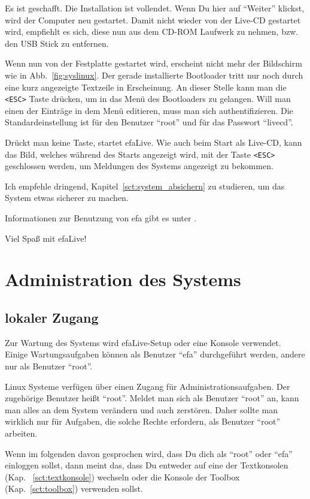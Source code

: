 \documentclass[a4paper,12pt,twoside]{article}
\begin{document}
Es ist geschafft. Die Installation ist vollendet. Wenn Du hier auf
"`Weiter"' klickst, wird der Computer neu
gestartet. Damit nicht wieder von der Live-CD gestartet wird, empfiehlt
es sich, diese nun aus dem CD-ROM Laufwerk zu nehmen, bzw. den USB
Stick zu entfernen.

Wenn nun von der Festplatte gestartet wird, erscheint nicht mehr der
Bildschirm wie in Abb.~\ref{fig:syslinux}. Der gerade installierte
Bootloader tritt nur noch durch eine kurz angezeigte Textzeile in
Erscheinung. An dieser Stelle kann man die \texttt{{\textless}ESC{\textgreater}}
Taste drücken, um in das Menü des Bootloaders zu gelangen. Will man
einen der Einträge in dem Menü editieren, muss man sich
authentifizieren. Die Standardeinstellung ist für den Benutzer
"`root"' und für das Passwort "`livecd"'. 

Drückt man keine Taste, startet efaLive. Wie auch beim Start als
Live-CD, kann das Bild, welches während des Starts angezeigt wird, mit
der Taste \texttt{{\textless}ESC{\textgreater}} geschlossen werden, um Meldungen
des Systems angezeigt zu bekommen.

Ich empfehle dringend, Kapitel~\ref{sct:system_absichern} zu studieren, um das System etwas
sicherer zu machen.

\bigskip
Informationen zur Benutzung von efa gibt es unter \cite{EFA2}.

\bigskip
Viel Spaß mit efaLive!


\section{Administration des Systems}
\label{sct:administration}
\subsection{lokaler Zugang}
\label{sct:lokaler_zugang}
Zur Wartung des Systems wird efaLive-Setup
oder eine Konsole verwendet. Einige Wartungsaufgaben können als
Benutzer "`efa"' durchgeführt werden, andere
nur als Benutzer "`root"'.

Linux Systeme verfügen über einen Zugang für Administrationsaufgaben.
Der zugehörige Benutzer heißt "`root"'.
Meldet man sich als Benutzer "`root"' an,
kann man alles an dem System verändern und auch zerstören. Daher sollte
man wirklich nur für Aufgaben, die solche Rechte erfordern, als
Benutzer "`root"' arbeiten.

Wenn im folgenden davon gesprochen wird, dass Du dich als
"`root"' oder "`efa"' einloggen sollst, dann meint das,
dass Du entweder auf eine der Textkonsolen (Kap.
~\ref{sct:textkonsole}) wechseln oder die Konsole der
Toolbox (Kap.~\ref{sct:toolbox}) verwenden sollst.
\end{document}
